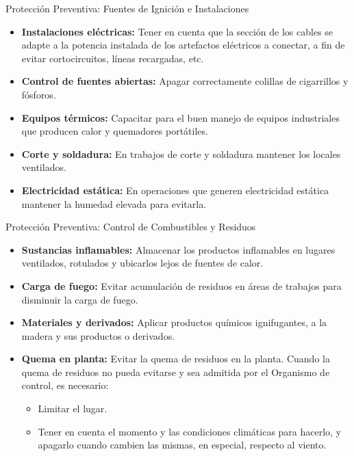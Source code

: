 \begin{frame}{Protección Preventiva: Fuentes de Ignición e Instalaciones}
  \begin{itemize}
    \small
    \item \textbf{Instalaciones eléctricas:} Tener en cuenta que la sección de los cables se adapte a la potencia instalada de los artefactos eléctricos a conectar, a fin de evitar cortocircuitos, líneas recargadas, etc.
    \item \textbf{Control de fuentes abiertas:} Apagar correctamente colillas de cigarrillos y fósforos.
    \item \textbf{Equipos térmicos:} Capacitar para el buen manejo de equipos industriales que producen calor y quemadores portátiles.
    \item \textbf{Corte y soldadura:} En trabajos de corte y soldadura mantener los locales ventilados.
    \item \textbf{Electricidad estática:} En operaciones que generen electricidad estática mantener la humedad elevada para evitarla.
  \end{itemize}
\end{frame}

\begin{frame}{Protección Preventiva: Control de Combustibles y Residuos}
  \begin{itemize}
    \small
    \item \textbf{Sustancias inflamables:} Almacenar los productos inflamables en lugares ventilados, rotulados y ubicarlos lejos de fuentes de calor.
    \item \textbf{Carga de fuego:} Evitar acumulación de residuos en áreas de trabajos para disminuir la carga de fuego.
    \item \textbf{Materiales y derivados:} Aplicar productos químicos
        ignifugantes, a la madera y sus productos o derivados.
    \item \textbf{Quema en planta:} Evitar la quema de residuos en la planta. Cuando la quema de residuos no pueda evitarse y sea admitida por el Organismo de control, es necesario:
    \begin{itemize}
      \footnotesize
      \item Limitar el lugar.
      \item Tener en cuenta el momento y las condiciones climáticas para hacerlo, y apagarlo cuando cambien las mismas, en especial, respecto al viento.
    \end{itemize}
  \end{itemize}
\end{frame}


